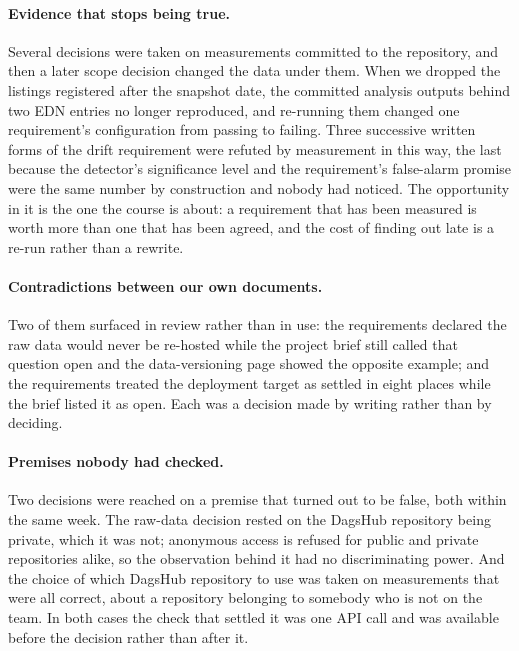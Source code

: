 \paragraph{Evidence that stops being true.}
Several decisions were taken on measurements committed to the repository, and then a later scope decision changed the data under them.
When we dropped the listings registered after the snapshot date, the committed analysis outputs behind two EDN entries no longer reproduced, and re-running them changed one requirement's configuration from passing to failing.
Three successive written forms of the drift requirement were refuted by measurement in this way, the last because the detector's significance level and the requirement's false-alarm promise were the same number by construction and nobody had noticed.
The opportunity in it is the one the course is about: a requirement that has been measured is worth more than one that has been agreed, and the cost of finding out late is a re-run rather than a rewrite.

\paragraph{Contradictions between our own documents.}
Two of them surfaced in review rather than in use: the requirements declared the raw data would never be re-hosted while the project brief still called that question open and the data-versioning page showed the opposite example; and the requirements treated the deployment target as settled in eight places while the brief listed it as open.
Each was a decision made by writing rather than by deciding.

\paragraph{Premises nobody had checked.}
Two decisions were reached on a premise that turned out to be false, both within the same week.
The raw-data decision rested on the DagsHub repository being private, which it was not; anonymous access is refused for public and private repositories alike, so the observation behind it had no discriminating power.
And the choice of which DagsHub repository to use was taken on measurements that were all correct, about a repository belonging to somebody who is not on the team.
In both cases the check that settled it was one API call and was available before the decision rather than after it.

